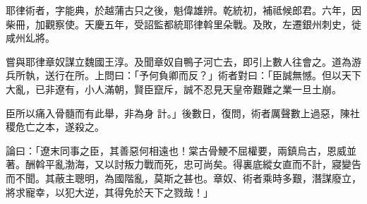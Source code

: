 \begin{pinyinscope}
 耶律術者，字能典，於越蒲古只之後，魁偉雄辨。乾統初，補祗候郎君。六年，因柴冊，加觀察使。天慶五年，受詔監都統耶律斡里朵戰。及敗，左遷銀州刺史，徙咸州乣將。



 嘗與耶律章奴謀立魏國王淳。及聞章奴自鴨子河亡去，即引上數人往會之。道為游兵所執，送行在所。上問曰：「予何負卿而反？」術者對曰：「臣誠無憾。但以天下大亂，已非遼有，小人滿朝，賢臣竄斥，誠不忍見天皇帝艱難之業一旦土崩。



 臣所以痛入骨髓而有此舉，非為身
 計。」後數日，復問，術者厲聲數上過惡，陳社稷危亡之本，遂殺之。



 論曰：「遼末同事之臣，其善惡何相遠也！棠古骨鯁不屈權要，兩鎮烏古，恩威並著。酬斡平亂渤海，又以討叛力戰而死，忠可尚矣。得裏底縱女直而不計，寢變告而不聞。其蔽主聰明，為國階亂，莫斯之甚也。章奴、術者乘時多艱，潛謀廢立，將求寵幸，以犯大逆，其得免於天下之戮哉！」



\end{pinyinscope}